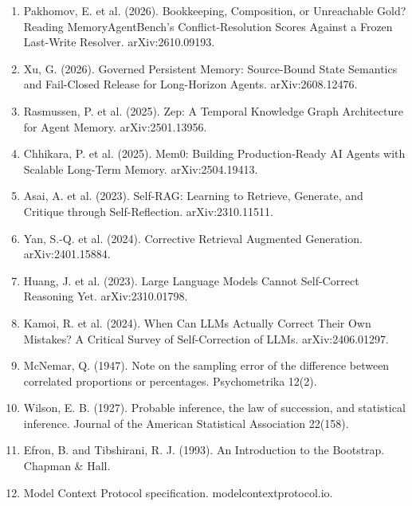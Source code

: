 \documentclass[10.5pt,a4paper,oneside]{report}
\begin{document}
\begin{enumerate}
\item Pakhomov, E. et al. (2026). Bookkeeping, Composition, or Unreachable Gold? Reading MemoryAgentBench's Conflict-Resolution Scores Against a Frozen Last-Write Resolver. arXiv:\allowbreak{}2610.09193.
\item Xu, G. (2026). Governed Persistent Memory: Source-Bound State Semantics and Fail-Closed Release for Long-Horizon Agents. arXiv:\allowbreak{}2608.12476.
\item Rasmussen, P. et al. (2025). Zep: A Temporal Knowledge Graph Architecture for Agent Memory. arXiv:\allowbreak{}2501.13956.
\item Chhikara, P. et al. (2025). Mem0: Building Production-Ready AI Agents with Scalable Long-Term Memory. arXiv:\allowbreak{}2504.19413.
\item Asai, A. et al. (2023). Self-RAG: Learning to Retrieve, Generate, and Critique through Self-Reflection. arXiv:\allowbreak{}2310.11511.
\item Yan, S.-Q. et al. (2024). Corrective Retrieval Augmented Generation. arXiv:\allowbreak{}2401.15884.
\item Huang, J. et al. (2023). Large Language Models Cannot Self-Correct Reasoning Yet. arXiv:\allowbreak{}2310.01798.
\item Kamoi, R. et al. (2024). When Can LLMs Actually Correct Their Own Mistakes? A Critical Survey of Self-Correction of LLMs. arXiv:\allowbreak{}2406.01297.
\item McNemar, Q. (1947). Note on the sampling error of the difference between correlated proportions or percentages. Psychometrika 12(2).
\item Wilson, E. B. (1927). Probable inference, the law of succession, and statistical inference. Journal of the American Statistical Association 22(158).
\item Efron, B. and Tibshirani, R. J. (1993). An Introduction to the Bootstrap. Chapman \& Hall.
\item Model Context Protocol specification. modelcontext\-protocol.io.
\end{enumerate}
\end{document}
